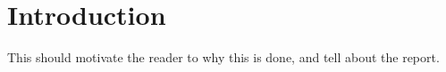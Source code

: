 
\chapter{Introduction}
This should motivate the reader to why this is done, and tell about the report.



